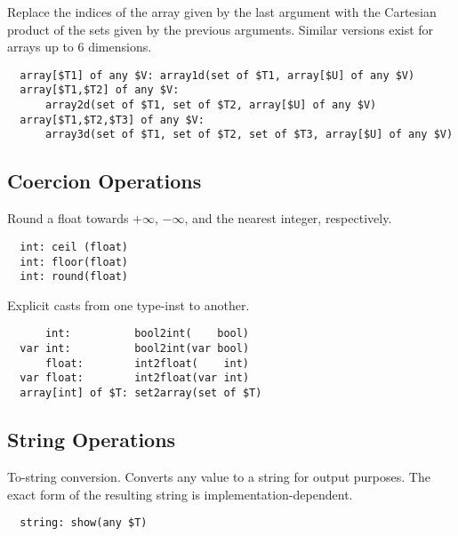 \documentclass[10pt]{scrartcl}
\newcommand{\ignore}[1]{}
\begin{document}
\builtin{}
Replace the indices of the array given by the last argument with the
Cartesian product of the sets given by the previous arguments.  Similar
versions exist for arrays up to 6 dimensions.
\begin{verbatim}
  array[$T1] of any $V: array1d(set of $T1, array[$U] of any $V)
  array[$T1,$T2] of any $V:
      array2d(set of $T1, set of $T2, array[$U] of any $V)
  array[$T1,$T2,$T3] of any $V:
      array3d(set of $T1, set of $T2, set of $T3, array[$U] of any $V)
\end{verbatim}

\ignore{
\builtin{}
Merges an array-of-arrays into an array, by folding \texttt{merge} over
the array-of-arrays.  It is a run-time error if any of the indices are
repeated in the result.
\begin{verbatim}
  array[$U] of $V: array_merge(array[$T] of array[$U] of $V)
\end{verbatim}

\builtin{}
Condenses an array-of-arrays into an array, by folding \texttt{++} over
the array-of-arrays.
The resulting indices are in the range \texttt{1..n}, where \texttt{n} is the
sum of the lengths of the arrays in the argument.
\begin{verbatim}
  array[int] of $T: condense(array[$U] of array[int] of $T)
\end{verbatim}
}

\subsection{Coercion Operations}
\builtin{}
Round a float towards $+\infty$, $-\infty$, and the nearest integer,
respectively.
\begin{verbatim}
  int: ceil (float)
  int: floor(float)
  int: round(float)
\end{verbatim}

\builtin{}
Explicit casts from one type-inst to another.
\begin{verbatim}
      int:          bool2int(    bool)
  var int:          bool2int(var bool)
      float:        int2float(    int)
  var float:        int2float(var int)
  array[int] of $T: set2array(set of $T)
\end{verbatim}


\subsection{String Operations}
\builtin{}
To-string conversion.  Converts any value to a string for output purposes.
The exact form of the resulting string is implementation-dependent.
\begin{verbatim}
  string: show(any $T)
\end{verbatim}
\end{document}
